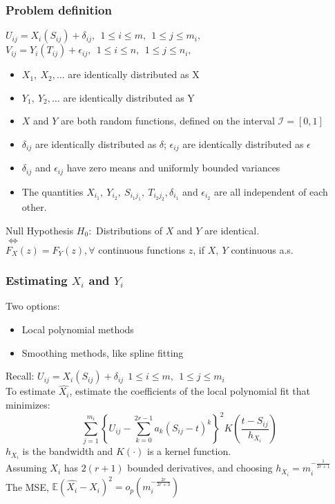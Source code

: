 \documentclass[10pt,dvipsnames,table]{beamer}
\newcommand{\Exp}{\mathds{E}}
\newcommand{\I}{\mathcal{I}}
\begin{document}
\begin{frame}
\frametitle{Problem definition}
$U_{ij} = X_i(S_{ij}) + \delta_{ij},\ \ 1 \leq i \leq m,\ \ 1 \leq j \leq m_i,$ \\
$V_{ij} = Y_i(T_{ij}) + \epsilon_{ij},\ \ 1 \leq i \leq n,\ \ 1 \leq j \leq n_i,$ \\

\begin{itemize}
\item
$X_1,\ X_2,\dots$ are identically distributed as X
\item
$Y_1,\ Y_2,\dots$ are identically distributed as Y
\item
$X$ and $Y$ are both random functions, defined on the interval $\I = [0, 1]$
\item
$\delta_{ij}$ are identically distributed as $\delta$; $\epsilon_{ij}$ are identically distributed as $\epsilon$
\item
$\delta_{ij}$ and $\epsilon_{ij}$ have zero means and uniformly bounded variances
\item
The quantities $X_{i_1},\ Y_{i_2},\ S_{i_1j_1},\ T_{i_2j_2}, \delta_{i_1}$ and $\epsilon_{i_2}$ are all independent of each other.
\end{itemize}
\pause
\begin{block}{Null Hypothesis}
$H_0: $ Distributions of $X$ and $Y$ are identical. \\ $\Leftrightarrow$ \\ $F_X(z) = F_Y(z), \forall $ continuous functions $z$, if $X,\ Y$ continuous a.s.
\end{block}
\end{frame}

\begin{frame}
\frametitle{Estimating $X_i$ and $Y_i$}
Two options:
\begin{itemize}
\item \pause Local polynomial methods
\item \pause Smoothing methods, like spline fitting
\end{itemize}
\pause Recall: $U_{ij} = X_i(S_{ij}) + \delta_{ij}\ \ 1 \leq i \leq m,\ \ 1 \leq j \leq m_i$\\
\pause To estimate $\hat{X_i}$, estimate the coefficients of the local polynomial fit that minimizes:
\[\sum _{j=1}^{m_i}\left\{U_{ij} - \sum_{k=0}^{2r - 1} a_k(S_{ij} - t)^k\right\}^2 K\left(\frac{t - S_{ij}}{h_{X_i}} \right) \]
\pause
$h_{X_i}$ is the bandwidth and $K(\cdot)$ is a kernel function. \\
\pause
Assuming $X_i$ has $2(r + 1)$ bounded derivatives, and choosing $h_{X_i} = m_i^{-\frac{1}{2r + 1}}$ \\
The MSE, $\Exp(\hat{X_i} - X_i)^2 = o_p(m_i^{-\frac{2r}{2r+3}}) $
\end{frame}
\end{document}
